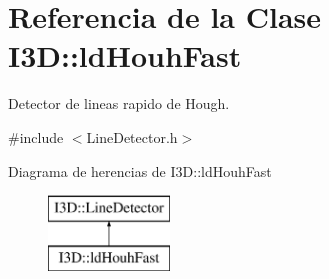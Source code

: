 \hypertarget{class_i3_d_1_1ld_houh_fast}{}\section{Referencia de la Clase I3D\+:\+:ld\+Houh\+Fast}
\label{class_i3_d_1_1ld_houh_fast}


Detector de lineas rapido de Hough.  




{\ttfamily \#include $<$Line\+Detector.\+h$>$}

Diagrama de herencias de I3D\+:\+:ld\+Houh\+Fast\begin{figure}[H]
\begin{center}
\leavevmode
\includegraphics[height=2.000000cm]{class_i3_d_1_1ld_houh_fast}
\end{center}
\end{figure}
